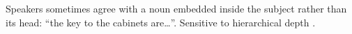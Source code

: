 
Speakers sometimes agree with a noun embedded inside the subject rather than its head: ``the key to the cabinets are\dots''. Sensitive to hierarchical depth \citep{bock1991}.
